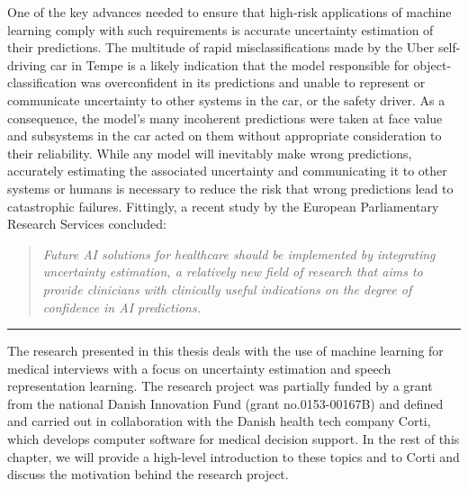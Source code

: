 One of the key advances needed to ensure that high-risk applications of machine learning comply with such requirements is accurate uncertainty estimation of their predictions. 
The multitude of rapid misclassifications made by the Uber self-driving car in Tempe is a likely indication that the model responsible for object-classification was overconfident in its predictions and unable to represent or communicate uncertainty to other systems in the car, or the safety driver. 
As a consequence, the model's many incoherent predictions were taken at face value and subsystems in the car acted on them without appropriate consideration to their reliability.
While any model will inevitably make wrong predictions, accurately estimating the associated uncertainty and communicating it to other systems or humans is necessary to reduce the risk that wrong predictions lead to catastrophic failures. 
Fittingly, a recent study by the European Parliamentary Research Services \parencite{europeanparliament_artificial_2022} concluded: 
%
\begin{quote}
    \centering\itshape
    Future AI solutions for healthcare should be implemented by integrating uncertainty estimation, a relatively new field of research that aims to provide clinicians with clinically useful indications on the degree of confidence in AI predictions.
\end{quote}
\begin{center}
\noindent\rule{0.2\textwidth}{0.5pt}
\end{center}
\vspace{1em}
%
%
\noindent The research presented in this thesis deals with the use of machine learning for medical interviews with a focus on uncertainty estimation and speech representation learning. 
The research project was partially funded by a grant from the national Danish Innovation Fund (grant no.\@ 0153-00167B) and defined and carried out in collaboration with the Danish health tech company Corti, which develops computer software for medical decision support. 
In the rest of this chapter, we will provide a high-level introduction to these topics and to Corti and discuss the motivation behind the research project.


